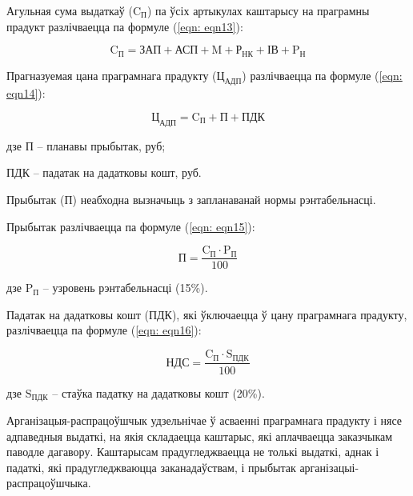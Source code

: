 Агульная сума выдаткаў ($\text{C}_\text{П}$) па ўсіх артыкулах каштарысу на праграмны прадукт разлічваецца па формуле (\ref{eqn: eqn13}):

\begin{equation}
    \label{eqn: eqn13}
    \text{C}_\text{П} = \text{ЗАП} + \text{АСП} + \text{M}
    + \text{Р}_\text{НК} + \text{ІВ} + \text{P}_\text{Н}
\end{equation}

Прагназуемая цана праграмнага прадукту ($\text{Ц}_\text{АДП}$) разлічваецца па формуле (\ref{eqn: eqn14}):

\begin{equation}
    \label{eqn: eqn14}
    \text{Ц}_\text{АДП} = \text{C}_\text{П} + \text{П} + \text{ПДК}
\end{equation}
\begin{Explanation}
    \item[дзе] $\text{П}$ -- планавы прыбытак, руб;
    \item ПДК -- падатак на дадатковы кошт, руб.
\end{Explanation}

Прыбытак (П) неабходна вызначыць з запланаванай нормы рэнтабельнасці.

Прыбытак разлічваецца па формуле (\ref{eqn: eqn15}):

\begin{equation}
    \label{eqn: eqn15}
    \text{П} = \frac{\text{C}_\text{П} \cdot \text{P}_\text{П}}{100}
\end{equation}
\begin{Explanation}
    \item[дзе] $\text{P}_\text{П}$ -- узровень рэнтабельнасці (15\%).
\end{Explanation}

Падатак на дадатковы кошт (ПДК), які ўключаецца ў цану праграмнага прадукту, разлічваецца па формуле (\ref{eqn: eqn16}):

\begin{equation}
    \label{eqn: eqn16}
    \text{НДС} = \frac{\text{C}_\text{П} \cdot \text{S}_\text{ПДК}}{100}
\end{equation}
\begin{Explanation}
    \item[дзе] $\text{S}_\text{ПДК}$ -- стаўка падатку на дадатковы кошт (20\%).
\end{Explanation}

Арганізацыя-распрацоўшчык удзельнічае ў асваенні праграмнага прадукту і нясе адпаведныя выдаткі, на якія складаецца каштарыс, які аплачваецца заказчыкам паводле дагавору. Каштарысам прадугледжваецца не толькі выдаткі, аднак і падаткі, які прадугледжваюцца заканадаўствам, і прыбытак арганізацыі-распрацоўшчыка.

